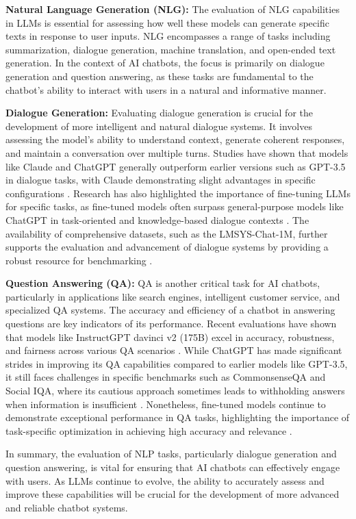\textbf{Natural Language Generation (NLG):} The evaluation of NLG capabilities in LLMs is essential for assessing how well these models can generate specific texts in response to user inputs. NLG encompasses a range of tasks including summarization, dialogue generation, machine translation, and open-ended text generation. In the context of AI chatbots, the focus is primarily on dialogue generation and question answering, as these tasks are fundamental to the chatbot’s ability to interact with users in a natural and informative manner.

\textbf{Dialogue Generation:} Evaluating dialogue generation is crucial for the development of more intelligent and natural dialogue systems. It involves assessing the model’s ability to understand context, generate coherent responses, and maintain a conversation over multiple turns. Studies have shown that models like Claude and ChatGPT generally outperform earlier versions such as GPT-3.5 in dialogue tasks, with Claude demonstrating slight advantages in specific configurations  . Research has also highlighted the importance of fine-tuning LLMs for specific tasks, as fine-tuned models often surpass general-purpose models like ChatGPT in task-oriented and knowledge-based dialogue contexts . The availability of comprehensive datasets, such as the LMSYS-Chat-1M, further supports the evaluation and advancement of dialogue systems by providing a robust resource for benchmarking .

\textbf{Question Answering (QA):} QA is another critical task for AI chatbots, particularly in applications like search engines, intelligent customer service, and specialized QA systems. The accuracy and efficiency of a chatbot in answering questions are key indicators of its performance. Recent evaluations have shown that models like InstructGPT davinci v2 (175B) excel in accuracy, robustness, and fairness across various QA scenarios . While ChatGPT has made significant strides in improving its QA capabilities compared to earlier models like GPT-3.5, it still faces challenges in specific benchmarks such as CommonsenseQA and Social IQA, where its cautious approach sometimes leads to withholding answers when information is insufficient  . Nonetheless, fine-tuned models continue to demonstrate exceptional performance in QA tasks, highlighting the importance of task-specific optimization in achieving high accuracy and relevance  .

In summary, the evaluation of NLP tasks, particularly dialogue generation and question answering, is vital for ensuring that AI chatbots can effectively engage with users. As LLMs continue to evolve, the ability to accurately assess and improve these capabilities will be crucial for the development of more advanced and reliable chatbot systems.

